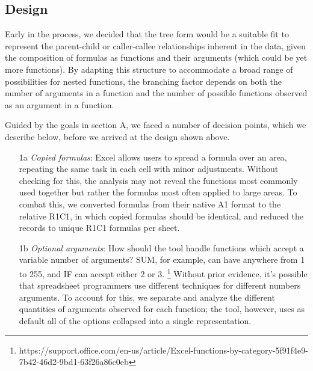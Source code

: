\documentclass[conference]{IEEEtran}
\begin{document}
\subsection{Design}
Early in the process, we decided that the tree form would be a suitable fit to represent the parent-child or caller-callee relationships inherent in the data, given the composition of formulas as functions and their arguments (which could be yet more functions). By adapting this structure to accommodate a broad range of possibilities for nested functions, the branching factor depends on both the number of arguments in a function and the number of possible functions observed as an argument in a function. \par
Guided by the goals in section A, we faced a number of decision points, which we describe below, before we arrived at the design shown above.


\begin{itemize}
	\item [1a] \textit{Copied formulas}: Excel allows users to spread a formula over an area, repeating the same task in each cell with minor adjustments. Without checking for this, the analysis may not reveal the functions most commonly used together but rather the formulas most often applied to large areas. To combat this, we converted formulas from their native A1 format to the relative R1C1, in which copied formulas should be identical, and reduced the records to unique R1C1 formulas per sheet.
	\item [1b] \textit{Optional arguments}: How should the tool handle functions which accept a variable number of arguments? SUM, for example, can have anywhere from 1 to 255, and IF can accept either 2 or 3. \footnote{https://support.office.com/en-us/article/Excel-functions-by-category-5f91f4e9-7b42-46d2-9bd1-63f26a86c0eb} Without prior evidence, it's possible that spreadsheet programmers use different techniques for different numbers arguments. To account for this, we separate and analyze the different quantities of arguments observed for each function; the tool, however, uses as default all of the options collapsed into a single representation.
\end{itemize}
\end{document}
